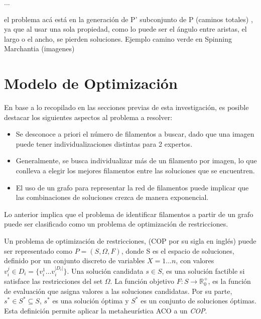 ...


el problema acá está en la generación de P' subconjunto de P (caminos totales) , ya que al usar una sola propiedad, como lo puede ser el ángulo entre aristas, el largo o el ancho, se pierden soluciones. Ejemplo camino verde en Spinning Marchantia (imagenes)





\section{Modelo de Optimización}

En base a lo recopilado en las secciones previas de esta investigaci\'on, es posible destacar los siguientes aspectos al problema a resolver:

\begin{itemize}
    \item Se desconoce a priori el n\'umero de filamentos a buscar, dado que una imagen puede tener individualizaciones distintas para 2 expertos.
    \item Generalmente, se busca individualizar m\'as de un filamento por imagen, lo que conlleva a elegir los mejores filamentos entre las soluciones que se encuentren.
    \item El uso de un grafo para representar la red de filamentos puede implicar que las combinaciones de soluciones crezca de manera exponencial.
\end{itemize}

Lo anterior implica que el problema de identificar filamentos a partir de un grafo puede ser clasificado como un problema de optimizaci\'on de restricciones\cite{blum2011hybrid}.


Un problema de optimización de restricciones, (COP por su sigla en ingl\'es) puede ser representado como $P = (S,\Omega ,F)$, donde S es el espacio de soluciones, definido por un conjunto discreto de variables $X = 1 \dotsc n$, con valores $v_{i}^{j} \in D_{i} = \{v_{i}^{1} \dotsc  v_{i}^{|D_{i}|}\}$. Una solución candidata $s \in S$, es una soluci\'on factible si satisface las restricciones del set $\Omega$. La funci\'on objetivo $F: S\rightarrow \mathbb R_{0}^{+}$, es la funci\'on de evaluaci\'on que asigna valores a las soluciones candidatas. Por su parte, $s^{*} \in S^{*} \subseteq S $, $s^{*}$ es una soluci\'on \'optima y $S^{*}$ es un conjunto de soluciones \'optimas\cite{socha2008ant}.
Esta definici\'on permite aplicar la metaheur\'istica ACO a un {\it COP}.

